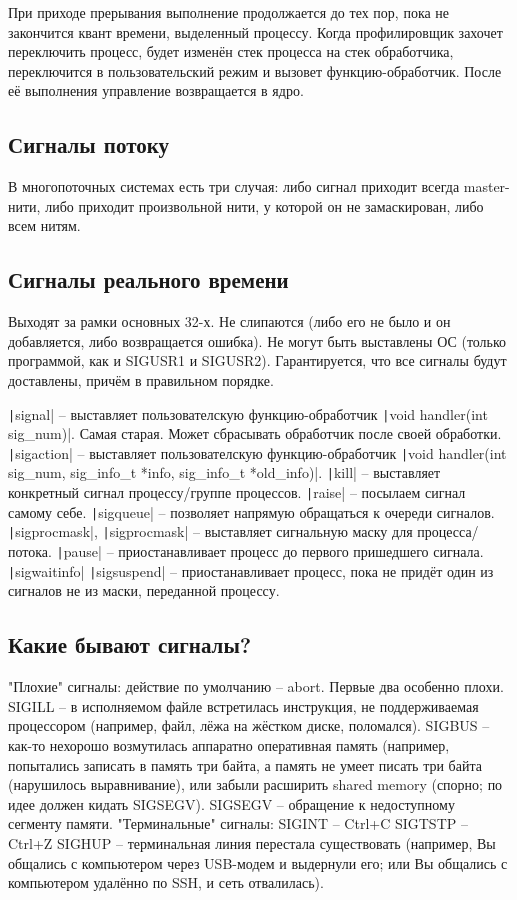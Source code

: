 \documentclass[a4paper,10pt]{article}
\newcommand{\ci}{\texttt}
\begin{document}
При приходе прерывания выполнение продолжается до тех пор, пока не закончится квант времени, выделенный процессу. 
Когда профилировщик захочет переключить процесс, будет изменён стек процесса на стек обработчика, переключится в пользовательский режим и вызовет функцию-обработчик. После её выполнения управление возвращается в ядро.

\subsection{Сигналы потоку}
В многопоточных системах есть три случая: либо сигнал приходит всегда master-нити, либо приходит произвольной нити, у которой он не замаскирован, либо всем нитям.

\subsection{Сигналы реального времени}
Выходят за рамки основных 32-х. Не слипаются (либо его не было и он добавляется, либо возвращается ошибка). Не могут быть выставлены ОС (только программой, как и SIGUSR1 и SIGUSR2).
Гарантируется, что все сигналы будут доставлены, причём в правильном порядке.

\ci|signal| -- выставляет пользователскую функцию-обработчик  \ci|void handler(int sig_num)|. Самая старая. Может сбрасывать обработчик после своей обработки.
\ci|sigaction| -- выставляет пользователскую функцию-обработчик  \ci|void handler(int sig_num, sig_info_t *info, sig_info_t *old_info)|.
\ci|kill| -- выставляет конкретный сигнал процессу/группе процессов.
\ci|raise| -- посылаем сигнал самому себе.
\ci|sigqueue| -- позволяет напрямую обращаться к очереди сигналов.
\ci|sigprocmask|, \ci|sigprocmask| -- выставляет сигнальную маску для процесса/потока.
\ci|pause| -- приостанавливает процесс до первого пришедшего сигнала.
\ci|sigwaitinfo|
\ci|sigsuspend| -- приостанавливает процесс, пока не придёт один из сигналов не из маски, переданной процессу.

\subsection{Какие бывают сигналы?}
"Плохие" сигналы: действие по умолчанию -- abort. Первые два особенно плохи.
SIGILL -- в исполняемом файле встретилась инструкция, не поддерживаемая процессором (например, файл, лёжа на жёстком диске, поломался).
SIGBUS -- как-то нехорошо возмутилась аппаратно оперативная память (например, попытались записать в память три байта, а память не умеет писать три байта (нарушилось выравнивание), или забыли расширить shared memory (спорно; по идее должен кидать SIGSEGV).
SIGSEGV -- обращение к недоступному сегменту памяти.
"Терминальные" сигналы:
SIGINT -- Ctrl+C
SIGTSTP -- Ctrl+Z
SIGHUP -- терминальная линия перестала существовать (например, Вы общались с компьютером через USB-модем и выдернули его; или Вы общались с компьютером удалённо по SSH, и сеть отвалилась).
\end{document}
